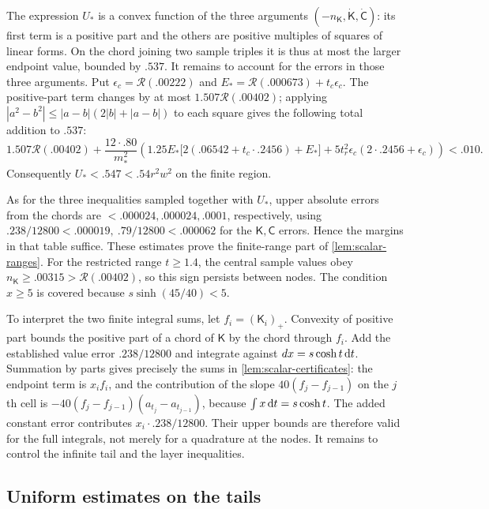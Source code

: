 The expression $U_*$ is a convex function of the three arguments $(-n_{\mathsf K},\dot{\mathsf K},\dot{\mathsf C})$: its first term is a positive part and the others are positive multiples of squares of linear forms. On the chord joining two sample triples it is thus at most the larger endpoint value, bounded by $.537$. It remains to account for the errors in those three arguments. Put $\epsilon_c=\mathcal{R}(.00222)$ and $E_*=\mathcal{R}(.000673)+t_c\epsilon_c$. The positive-part term changes by at most $1.507\mathcal{R}(.00402)$; applying $|a^2-b^2|\le|a-b|(2|b|+|a-b|)$ to each square gives the following total addition to $.537$:
\[
 1.507\mathcal{R}(.00402)+\frac{12\cdot .80}{m_*^2}
 \left(1.25 E_*\big[2(.06542+t_c\cdot.2456)+E_*\big]
             +5t_r^2\epsilon_c(2\cdot .2456+\epsilon_c)\right)<.010 .
\]
Consequently $U_*<.547<.54r^2w^2$ on the finite region.

As for the three inequalities sampled together with $U_*$, upper absolute errors from the chords are $<.000024,.000024,.0001$, respectively, using $.238/12800<.000019,\ .79/12800<.000062$ for the $\mathsf K,\mathsf C$ errors. Hence the margins in that table suffice. These estimates prove the finite-range part of \cref{lem:scalar-ranges}. For the restricted range $t\ge1.4$, the central sample values obey $n_{\mathsf K}\ge.00315>\mathcal{R}(.00402)$, so this sign persists between nodes. The condition $x\ge5$ is covered because $s\sinh(45/40)<5$.

To interpret the two finite integral sums, let $f_i=(\mathsf K_i)_+$. Convexity of positive part bounds the positive part of a chord of $\mathsf K$ by the chord through $f_i$. Add the established value error $.238/12800$ and integrate against $dx=s\cosh t\,\mathrm{d} t$. Summation by parts gives precisely the sums in \cref{lem:scalar-certificates}: the endpoint term is $x_if_i$, and the contribution of the slope $40(f_j-f_{j-1})$ on the $j$th cell is $-40(f_j-f_{j-1})(a_{t_j}-a_{t_{j-1}})$, because $\int x\,\mathrm{d} t=s\cosh t$. The added constant error contributes $x_i\cdot.238/12800$. Their upper bounds are therefore valid for the full integrals, not merely for a quadrature at the nodes. It remains to control the infinite tail and the layer inequalities.

\subsection{Uniform estimates on the tails}

